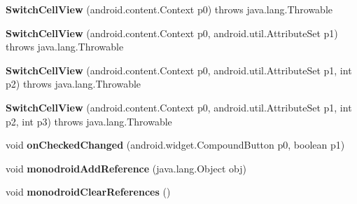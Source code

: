 \begin{DoxyCompactItemize}
\item 
\mbox{\label{classmd5b60ffeb829f638581ab2bb9b1a7f4f3f_1_1_switch_cell_view_a1a542bccac4c26b5a04b987ac7471b91}} 
{\bfseries Switch\+Cell\+View} (android.\+content.\+Context p0)  throws java.\+lang.\+Throwable 	
\item 
\mbox{\label{classmd5b60ffeb829f638581ab2bb9b1a7f4f3f_1_1_switch_cell_view_ac3d2a947e764c684c9a5dad1a993e526}} 
{\bfseries Switch\+Cell\+View} (android.\+content.\+Context p0, android.\+util.\+Attribute\+Set p1)  throws java.\+lang.\+Throwable 	
\item 
\mbox{\label{classmd5b60ffeb829f638581ab2bb9b1a7f4f3f_1_1_switch_cell_view_a58a93fdb9b3b35555b2772e70d41d644}} 
{\bfseries Switch\+Cell\+View} (android.\+content.\+Context p0, android.\+util.\+Attribute\+Set p1, int p2)  throws java.\+lang.\+Throwable 	
\item 
\mbox{\label{classmd5b60ffeb829f638581ab2bb9b1a7f4f3f_1_1_switch_cell_view_a674a5161d17501317efdded62c49a489}} 
{\bfseries Switch\+Cell\+View} (android.\+content.\+Context p0, android.\+util.\+Attribute\+Set p1, int p2, int p3)  throws java.\+lang.\+Throwable 	
\item 
\mbox{\label{classmd5b60ffeb829f638581ab2bb9b1a7f4f3f_1_1_switch_cell_view_aa03e11d93abb9b4b5c3b933f310b2a1e}} 
void {\bfseries on\+Checked\+Changed} (android.\+widget.\+Compound\+Button p0, boolean p1)
\item 
\mbox{\label{classmd5b60ffeb829f638581ab2bb9b1a7f4f3f_1_1_switch_cell_view_a6526a7d8e09d4f580f9ba2058b1a31b7}} 
void {\bfseries monodroid\+Add\+Reference} (java.\+lang.\+Object obj)
\item 
\mbox{\label{classmd5b60ffeb829f638581ab2bb9b1a7f4f3f_1_1_switch_cell_view_ac5c13d6e582a1a4005ce2de3fba31e9e}} 
void {\bfseries monodroid\+Clear\+References} ()
\end{DoxyCompactItemize}
